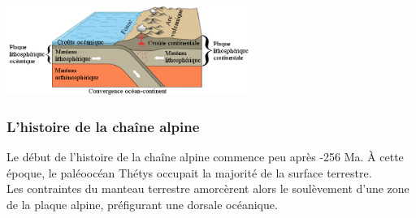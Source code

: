 \documentclass[a4paper,11pt]{article}
\begin{document}
\begin{center}
  \includegraphics[width=8cm]{Images/subduction_2.png}
\end{center}

\subsubsection{L'histoire de la chaîne alpine}

Le début de l'histoire de la chaîne alpine commence peu après -256 Ma. À cette époque, le paléoocéan Thétys occupait la majorité de la surface terrestre. \\
Les contraintes du manteau terrestre amorcèrent alors le soulèvement d'une zone de la plaque alpine, préfigurant une dorsale océanique.
\end{document}
